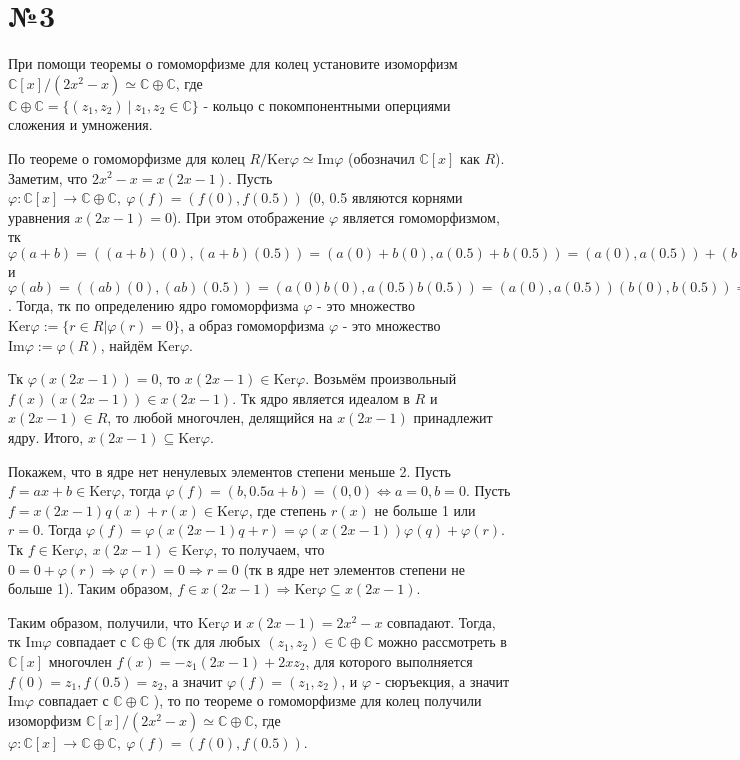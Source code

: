 \documentclass[a4paper, 16pt]{article}
\renewcommand{\C}{\mathbb{C}}
\newenvironment{solution}[1][Решение]{%
	\begin{trivlist}
		\item[\hskip \labelsep {\bfseries #1:}]
		\item \hspace{15pt}
	}{
	\end{trivlist}
}
\begin{document}
	\section*{№3}
	
		При помощи теоремы о гомоморфизме для колец установите изоморфизм $\C[x] / (2x^2-x) \simeq \C \oplus \C$, где \\ $\C \oplus \C = \{(z_1, z_2) \ | \ z_1, z_2 \in \C\}$ - кольцо с покомпонентными оперциями сложения и умножения.
		
		\begin{solution}
			По теореме о гомоморфизме для колец $R / \text{Ker} \varphi \simeq \text{Im} \varphi$ (обозначил $\C[x]$ как $R$). Заметим, что $2x^2-x = x(2x-1)$. Пусть $\varphi: \C[x] \to \C \oplus \C, \ \varphi(f) = (f(0), f(0.5))$ (0, 0.5 являются корнями уравнения $x(2x-1) = 0$).  При этом отображение $\varphi$ является гомоморфизмом, тк $\varphi(a + b) = ((a+b)(0), (a+b)(0.5)) = (a(0) + b(0), a(0.5) + b(0.5)) = (a(0), a(0.5)) + (b(0), b(0.5)) = \varphi(a) + \varphi(b)$ и $\varphi(ab) = ((ab)(0), (ab)(0.5)) = (a(0)b(0), a(0.5)b(0.5)) = (a(0),a(0.5)) (b(0),b(0.5))= \varphi(a)\varphi(b) \ \forall a, b \in R$. Тогда, тк по определению ядро гомоморфизма $\varphi$ - это множество $\text{Ker}\varphi := \{r \in R | \varphi(r) = 0\}$, а образ гомоморфизма $\varphi$ - это множество $\text{Im} \varphi := \varphi(R)$, найдём $\text{Ker}\varphi$. 
			
			Тк $\varphi (x(2x-1)) = 0$, то $x(2x-1) \in \text{Ker}\varphi$. Возьмём произвольный $f(x)(x(2x-1))  \in x(2x-1)$. Тк ядро является идеалом в $R$ и $x(2x-1) \in R$, то любой многочлен, делящийся на $x(2x-1)$ принадлежит ядру. Итого, $x(2x-1) \subseteq \text{Ker} \varphi$.
			
			Покажем, что в ядре нет ненулевых элементов степени меньше 2. Пусть $f = ax + b \in \text{Ker} \varphi$, тогда $\varphi(f) = (b, 0.5a+b) = (0, 0) \Leftrightarrow a = 0, b = 0$.
			 Пусть $f = x(2x-1) q(x) + r(x) \in \text{Ker}\varphi$, где степень $r(x)$ не больше 1 или $r = 0$. Тогда $\varphi(f) = \varphi(x(2x-1) q + r) =  \varphi(x(2x-1)) \varphi(q)  +  \varphi(r)$. Тк $f \in \text{Ker}\varphi, \ x(2x-1) \in \text{Ker}\varphi$, то получаем, что $0 = 0 + \varphi(r) \Rightarrow \varphi(r) = 0 \Rightarrow r = 0$ (тк в ядре нет элементов степени не больше 1). Таким образом, $f \in x(2x-1) \Rightarrow \text{Ker}\varphi \subseteq x(2x-1)$.
			 
			 Таким образом, получили, что $\text{Ker} \varphi$ и $x(2x-1) = 2x^2-x$ совпадают. Тогда, тк  $\text{Im}\varphi$ совпадает с $\C \oplus \C$ (тк для любых $(z_1, z_2) \in \C \oplus \C$ можно рассмотреть в $\C[x]$ многочлен $f(x) = -z_1(2x-1) + 2xz_2$, для которого выполняется $f(0) = z_1, f(0.5) = z_2$, а значит $\varphi(f) = (z_1, z_2)$, и $\varphi$ - сюръекция, а значит $\text{Im}\varphi$ совпадает с $\C \oplus \C$ ), то  по теореме о гомоморфизме для колец получили изоморфизм $\C[x] / (2x^2-x) \simeq \C \oplus \C$, где
			 $\varphi: \C[x] \to \C \oplus \C, \ \varphi(f) = (f(0), f(0.5))$. 
	
		\end{solution}
	
\end{document}

